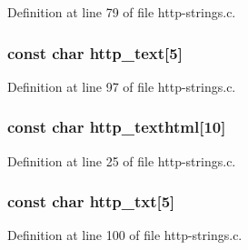 Definition at line 79 of file http-\/strings.c.

\hypertarget{http-strings_8h_a03afa2e3239d727db67e1d943268bfbe}{
\subsubsection[{http\_\-text}]{\setlength{\rightskip}{0pt plus 5cm}const char {\bf http\_\-text}\mbox{[}5\mbox{]}}}
\label{http-strings_8h_a03afa2e3239d727db67e1d943268bfbe}


Definition at line 97 of file http-\/strings.c.

\hypertarget{http-strings_8h_a0b945415ffe9889bcc9f876fbf332134}{
\subsubsection[{http\_\-texthtml}]{\setlength{\rightskip}{0pt plus 5cm}const char {\bf http\_\-texthtml}\mbox{[}10\mbox{]}}}
\label{http-strings_8h_a0b945415ffe9889bcc9f876fbf332134}


Definition at line 25 of file http-\/strings.c.

\hypertarget{http-strings_8h_a4f366bfe5aadc430314df6368294c385}{
\subsubsection[{http\_\-txt}]{\setlength{\rightskip}{0pt plus 5cm}const char {\bf http\_\-txt}\mbox{[}5\mbox{]}}}
\label{http-strings_8h_a4f366bfe5aadc430314df6368294c385}


Definition at line 100 of file http-\/strings.c.

